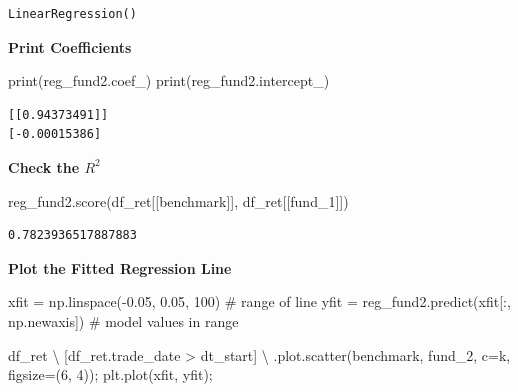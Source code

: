 \documentclass[
  letterpaper,
  DIV=11,
  numbers=noendperiod]{scrreprt}
\newenvironment{Shaded}{\begin{snugshade}}{\end{snugshade}}
\newcommand{\BuiltInTok}[1]{\textcolor[rgb]{0.00,0.23,0.31}{#1}}
\newcommand{\CommentTok}[1]{\textcolor[rgb]{0.37,0.37,0.37}{#1}}
\newcommand{\DecValTok}[1]{\textcolor[rgb]{0.68,0.00,0.00}{#1}}
\newcommand{\FloatTok}[1]{\textcolor[rgb]{0.68,0.00,0.00}{#1}}
\newcommand{\NormalTok}[1]{\textcolor[rgb]{0.00,0.23,0.31}{#1}}
\newcommand{\OperatorTok}[1]{\textcolor[rgb]{0.37,0.37,0.37}{#1}}
\newcommand{\StringTok}[1]{\textcolor[rgb]{0.13,0.47,0.30}{#1}}
\begin{document}
\begin{verbatim}
LinearRegression()
\end{verbatim}

\textbf{Print Coefficients}

\begin{Shaded}
\begin{Highlighting}[]
\BuiltInTok{print}\NormalTok{(reg\_fund2.coef\_)}
\BuiltInTok{print}\NormalTok{(reg\_fund2.intercept\_)}
\end{Highlighting}
\end{Shaded}

\begin{verbatim}
[[0.94373491]]
[-0.00015386]
\end{verbatim}

\textbf{Check the \(R^2\)}

\begin{Shaded}
\begin{Highlighting}[]
\NormalTok{reg\_fund2.score(df\_ret[[}\StringTok{\textquotesingle{}benchmark\textquotesingle{}}\NormalTok{]], df\_ret[[}\StringTok{\textquotesingle{}fund\_1\textquotesingle{}}\NormalTok{]])}
\end{Highlighting}
\end{Shaded}

\begin{verbatim}
0.7823936517887883
\end{verbatim}

\textbf{Plot the Fitted Regression Line}

\begin{Shaded}
\begin{Highlighting}[]
\NormalTok{xfit }\OperatorTok{=}\NormalTok{ np.linspace(}\OperatorTok{{-}}\FloatTok{0.05}\NormalTok{, }\FloatTok{0.05}\NormalTok{, }\DecValTok{100}\NormalTok{)           }\CommentTok{\# range of line}
\NormalTok{yfit }\OperatorTok{=}\NormalTok{ reg\_fund2.predict(xfit[:, np.newaxis])  }\CommentTok{\# model values in range}


\NormalTok{df\_ret }\OperatorTok{\textbackslash{}}
\NormalTok{    [df\_ret.trade\_date }\OperatorTok{\textgreater{}}\NormalTok{ dt\_start] }\OperatorTok{\textbackslash{}}
\NormalTok{    .plot.scatter(}\StringTok{\textquotesingle{}benchmark\textquotesingle{}}\NormalTok{, }\StringTok{\textquotesingle{}fund\_2\textquotesingle{}}\NormalTok{, c}\OperatorTok{=}\StringTok{\textquotesingle{}k\textquotesingle{}}\NormalTok{, figsize}\OperatorTok{=}\NormalTok{(}\DecValTok{6}\NormalTok{, }\DecValTok{4}\NormalTok{))}\OperatorTok{;}
\NormalTok{plt.plot(xfit, yfit)}\OperatorTok{;}
\end{Highlighting}
\end{Shaded}
\end{document}
